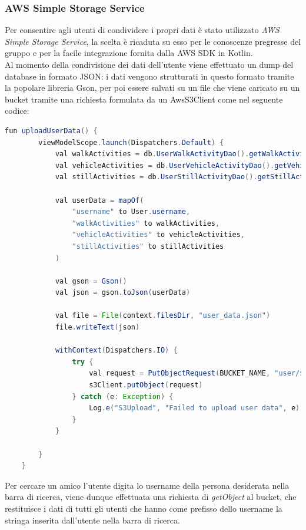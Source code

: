 \documentclass{article}
\begin{document}
    \subsubsection*{AWS Simple Storage Service}
    Per consentire agli utenti di condividere i propri dati è stato utilizzato \textit{AWS Simple Storage Service}, la scelta è ricaduta su esso per le conoscenze pregresse del gruppo e per la facile integrazione fornita dalla AWS SDK in Kotlin.\\
    Al momento della condivisione dei dati dell'utente viene effettuato un dump del database in formato JSON: i dati vengono strutturati in questo formato tramite la popolare libreria Gson, per poi essere salvati su un file che viene caricato su un bucket tramite una richiesta formulata da un AwsS3Client come nel seguente codice:\\
    \begin{lstlisting}[language=Java]
    fun uploadUserData() {
        viewModelScope.launch(Dispatchers.Default) {
            val walkActivities = db.UserWalkActivityDao().getWalkActivitiesByUserId(User.id)
            val vehicleActivities = db.UserVehicleActivityDao().getVehicleActivitiesByUserId(User.id)
            val stillActivities = db.UserStillActivityDao().getStillActivitiesByUserId(User.id)

            val userData = mapOf(
                "username" to User.username,
                "walkActivities" to walkActivities,
                "vehicleActivities" to vehicleActivities,
                "stillActivities" to stillActivities
            )

            val gson = Gson()
            val json = gson.toJson(userData)

            val file = File(context.filesDir, "user_data.json")
            file.writeText(json)

            withContext(Dispatchers.IO) {
                try {
                    val request = PutObjectRequest(BUCKET_NAME, "user/${User.username}.json", file)
                    s3Client.putObject(request)
                } catch (e: Exception) {
                    Log.e("S3Upload", "Failed to upload user data", e)
                }
            }

        }
    }

    \end{lstlisting}
    Per cercare un amico l'utente digita lo username della persona desiderata nella barra di ricerca, viene dunque effettuata una richiesta di \textit{getObject} al bucket, che restituisce i dati di tutti gli utenti che hanno come prefisso dello username la stringa inserita dall'utente nella barra di ricerca.
\end{document}
